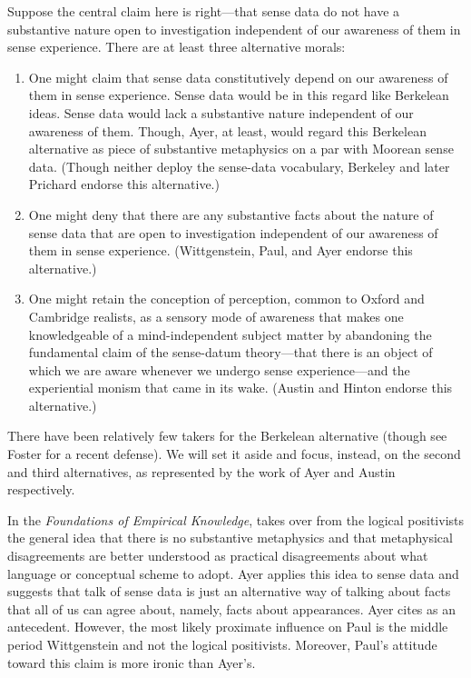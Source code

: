 Suppose the central claim here is right---that sense data do not have a substantive nature open to investigation independent of our awareness of them in sense experience. There are at least three alternative morals:

\begin{enumerate}
	\item One might claim that sense data constitutively depend on our awareness of them in sense experience. Sense data would be in this regard like Berkelean ideas. Sense data would lack a substantive nature independent of our awareness of them. Though, Ayer, at least, would regard this Berkelean alternative as piece of substantive metaphysics on a par with Moorean sense data. (Though neither deploy the sense-data vocabulary, Berkeley and later Prichard endorse this alternative.)
	\item One might deny that there are any substantive facts about the nature of sense data that are open to investigation independent of our awareness of them in sense experience. (Wittgenstein, Paul, and Ayer endorse this alternative.)
	\item One might retain the conception of perception, common to Oxford and Cambridge realists, as a sensory mode of awareness that makes one knowledgeable of a mind-independent subject matter by abandoning the fundamental claim of the sense-datum theory---that there is an object of which we are aware whenever we undergo sense experience---and the experiential monism that came in its wake. (Austin and Hinton endorse this alternative.)
\end{enumerate}

There have been relatively few takers for the Berkelean alternative (though see Foster \citeyear{Foster:00ny} for a recent defense). We will set it aside and focus, instead, on the second and third alternatives, as represented by the work of Ayer and Austin respectively.

In the \emph{Foundations of Empirical Knowledge}, \citet{Ayer:1958kx} takes over from the logical positivists the general idea that there is no substantive metaphysics and that metaphysical disagreements are better understood as practical disagreements about what language or conceptual scheme to adopt. Ayer applies this idea to sense data and suggests that talk of sense data is just an alternative way of talking about facts that all of us can agree about, namely, facts about appearances. Ayer cites \citet{Paul:1936kd} as an antecedent. However, the most likely proximate influence on Paul is the middle period Wittgenstein and not the logical positivists. Moreover, Paul's attitude toward this claim is more ironic than Ayer's.%

